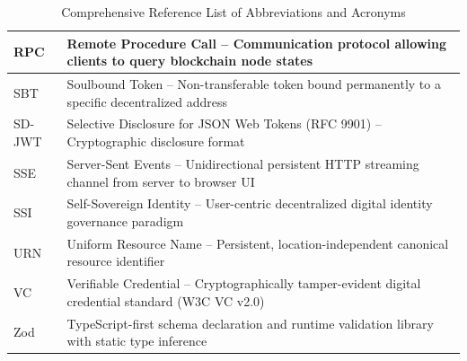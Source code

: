 \begin{table}[H]
{\begin{tabular}{|>{\centering\arraybackslash}p{2.6cm}|>{\RaggedRight}p{12.5cm}|}
\hline
RPC & Remote Procedure Call -- Communication protocol allowing clients to query blockchain node states \\
\hline
SBT & Soulbound Token -- Non-transferable token bound permanently to a specific decentralized address \\
\hline
SD-JWT & Selective Disclosure for JSON Web Tokens (RFC 9901) -- Cryptographic disclosure format \\
\hline
SSE & Server-Sent Events -- Unidirectional persistent HTTP streaming channel from server to browser UI \\
\hline
SSI & Self-Sovereign Identity -- User-centric decentralized digital identity governance paradigm \\
\hline
URN & Uniform Resource Name -- Persistent, location-independent canonical resource identifier \\
\hline
VC & Verifiable Credential -- Cryptographically tamper-evident digital credential standard (W3C VC v2.0) \\
\hline
Zod & TypeScript-first schema declaration and runtime validation library with static type inference \\
\hline
\end{tabular}
}
\caption{Comprehensive Reference List of Abbreviations and Acronyms}
\label{tab:abbreviations}
\end{table}
